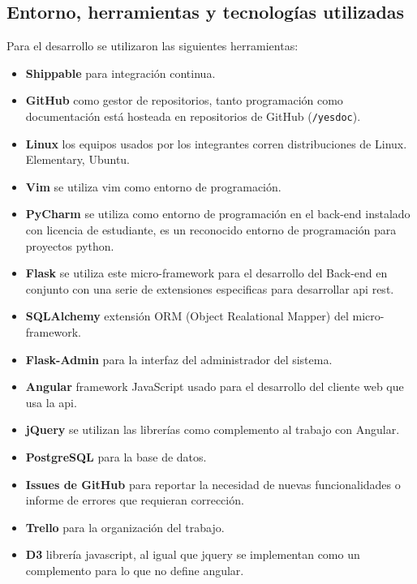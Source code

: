 




\subsection{Entorno, herramientas y tecnologías utilizadas}

Para el desarrollo se utilizaron las siguientes herramientas:

\begin{itemize}
\item \textbf{Shippable} para integración continua.
\item \textbf{GitHub}  como gestor de repositorios, tanto programación como documentación está hosteada en repositorios de GitHub (\texttt{/yesdoc}).
\item \textbf{Linux} los equipos usados por los integrantes corren distribuciones de Linux. Elementary, Ubuntu.
\item \textbf {Vim} se utiliza vim como entorno de programación.
\item \textbf{PyCharm} se utiliza como entorno de programación en el back-end instalado con licencia de estudiante, es un reconocido entorno de programación para proyectos python.
\item \textbf{Flask} se utiliza este micro-framework para el desarrollo del Back-end en conjunto con una serie de extensiones especificas para desarrollar api rest.
\item \textbf{SQLAlchemy} extensión ORM (Object Realational Mapper) del micro-framework.
\item \textbf{Flask-Admin} para la interfaz del administrador del sistema.
\item \textbf{Angular} framework JavaScript usado para el desarrollo del cliente web que usa la api.
\item \textbf{jQuery} se utilizan las librerías como complemento al trabajo con Angular.
\item \textbf{PostgreSQL} para la base de datos.
\item \textbf{Issues de GitHub} para reportar la necesidad de nuevas funcionalidades o informe de errores que requieran corrección.
\item \textbf{Trello} para la organización del trabajo.
\item \textbf{D3} librería javascript, al igual que jquery se implementan como un complemento para lo que no define angular.

\end{itemize}
